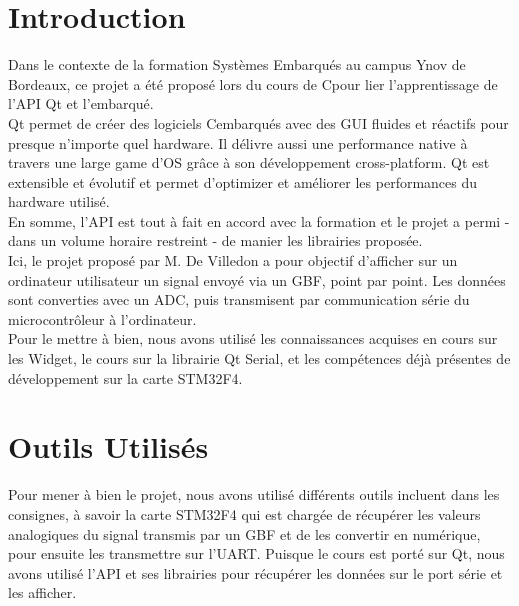 \documentclass[11pt, french]{article}
\begin{document}
\newcommand{\CC}{C\nolinebreak\hspace{-.05em}\raisebox{.4ex}{\tiny\bf +}\nolinebreak\hspace{-.10em}\raisebox{.4ex}{\tiny\bf +}}
\def\CC{{C\nolinebreak[4]\hspace{-.05em}\raisebox{.4ex}{\tiny\bf ++}}}

\tableofcontents
\newpage
\section{Introduction}

Dans le contexte de la formation Systèmes Embarqués au campus Ynov de Bordeaux, ce projet a été proposé lors du cours de \CC pour lier l'apprentissage de l'API Qt et l'embarqué.\\

Qt permet de créer des logiciels \CC embarqués avec des GUI fluides et réactifs pour presque n'importe quel hardware. Il délivre aussi une performance native à travers une large game d'OS grâce à son développement cross-platform. Qt est extensible et évolutif et permet d'optimizer et améliorer les performances du hardware utilisé.\\

En somme, l'API est tout à fait en accord avec la formation et le projet a permi - dans un volume horaire restreint - de manier les librairies proposée.\\

Ici, le projet proposé par M. De Villedon a pour objectif d'afficher sur un ordinateur utilisateur un signal envoyé via un GBF, point par point. Les données sont converties avec un ADC, puis transmisent par communication série du microcontrôleur à l'ordinateur.\\

Pour le mettre à bien, nous avons utilisé les connaissances acquises en cours sur les Widget, le cours sur la librairie Qt Serial, et les compétences déjà présentes de développement sur la carte STM32F4.\\

\newpage

\section{Outils Utilisés}
Pour mener à bien le projet, nous avons utilisé différents outils incluent dans les consignes, à savoir la carte STM32F4 qui est chargée de récupérer les valeurs analogiques du signal transmis par un GBF et de les convertir en numérique, pour ensuite les transmettre sur l'UART.
Puisque le cours est porté sur Qt, nous avons utilisé l'API et ses librairies pour récupérer les données sur le port série et les afficher.
\end{document}
